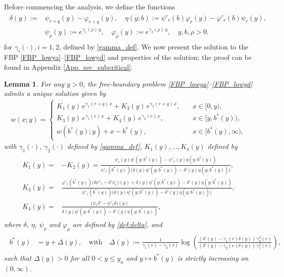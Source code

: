 \documentclass[11pt]{article} %
\newtheorem{lemma}[theorem]{Lemma}
\renewcommand{\phi}{\varphi}
\numberwithin{komcounter}{section}
\numberwithin{equation}{section}
\numberwithin{theorem}{section}
\begin{document}
Before commencing the analysis, we define the functions
\begin{align}
\label{def:delta}
\begin{split}
\delta(y) := &\psi_{r+q}(y) - \phi_{r+q}(y), \quad 
\eta(y;b) := \psi'_r(b)\phi_r(y) - \phi'_r(b) \psi_r(y), \quad \\ 
&\psi_\rho(y) := e^{\gamma_1(\rho) \,y}, \quad 
\phi_\rho(y) := e^{\gamma_2(\rho) \,y}, \quad 
y, b, \rho > 0 . 
\end{split}
\end{align}
for $\gamma_i(\cdot),i=1,2$, defined by \eqref{gamma_def}.
We now present the solution to the FBP \eqref{FBP_lowya}--\eqref{FBP_lowyd} and properties of the solution; the proof can be found in Appendix \ref{App_sec_subcritical}.

\begin{lemma} \label{sol:FBP1}
For any $y>0$, the free-boundary problem \eqref{FBP_lowya}--\eqref{FBP_lowyd} admits a unique solution given by 
\begin{align} \label{w_sol_simple_def}
w(x;y)= 
\begin{cases}
K_1(y) \, e^{\gamma_1(r+q) \, x} + K_2(y) \, e^{\gamma_2(r+q) \, x}, \quad &x \in [0,y),\\
K_3(y) \, e^{\gamma_1(r) \, x} + K_4(y) \, e^{\gamma_2(r) \, x}, \quad &x \in [y,b^*(y)),\\
w(b^*(y);y) + x - b^*(y), \quad &x\in [b^*(y),\infty),
\end{cases}
\end{align}
with $\gamma_1(\cdot)$, $\gamma_2(\cdot)$ defined by \eqref{gamma_def}, $K_1(y), \ldots, K_4(y)$ defined by 
\begin{align}\label{constants_simple}
\begin{split}
K_1(y) = & - K_2(y) =  
\frac{\psi_r(y) \eta' (y; b^*(y)) - \psi'_r(y)\eta (y; b^*(y))}{\psi'_r(b^*(y))\bigl(\delta(y) \eta'(y; b^*(y)) - \delta'(y) \eta(y; b^*(y))\bigr)}, \\
K_3(y) = 
&\frac{\phi'_r(b^*(y)) \bigl( \delta \psi'_r - \delta' \psi_r \bigr)(y) + \delta(y) \eta'(y; b^*(y)) - \delta'(y) \eta(y; b^*(y))}{\psi'_r(b^*(y))\bigl(\delta(y) \eta'(y; b^*(y)) - \delta'(y) \eta(y; b^*(y))\bigr)}, \\ 
K_4(y) = 
&\frac{ \big(\psi_r \delta' -  \psi'_r \delta \big)(y)}{\delta(y) \eta'(y; b^*(y)) - \delta'(y) \eta(y; b^*(y))},
\end{split}
\end{align}
where $\delta$, $\eta$, $\psi_\rho$ and $\phi_\rho$ are defined by \eqref{def:delta}, and 
\begin{align} \label{def_deltay}
\begin{split}
b^*(y) &=  y + \Delta(y), \quad \text{with} \quad  
\Delta(y) := \frac{1}{\gamma_1(r)-\gamma_2(r)}\log\left(\frac{(\delta'(y)-\gamma_1(r)\delta(y)) \, \gamma_2^2(r)}{(\delta'(y)-\gamma_2(r)\delta(y)) \, \gamma_1^2(r)}\right),
\end{split}
\end{align}
such that $\Delta(y) > 0$ for all $0 < y \leq y_u$ and $y \mapsto b^*(y)$ is strictly increasing on $(0,\infty)$.
\end{lemma} 
\end{document}
